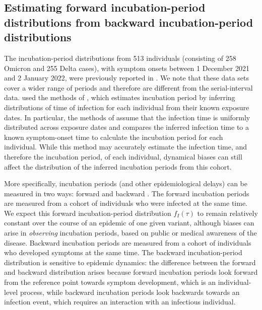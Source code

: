 \documentclass[12pt]{article}
\begin{document}
\subsection{Estimating forward incubation-period distributions from backward incubation-period distributions}

The incubation-period distributions from 513 individuals (consisting of 258 Omicron and 255 Delta cases), with symptom onsets between 1 December 2021 and 2 January 2022, were previously reported in \cite{backer2021omicron}.
We note that these data sets cover a wider range of periods and therefore are different from the serial-interval data.
\cite{backer2021omicron} used the methods of \cite{backer2020incubation}, which estimates incubation period by inferring distributions of time of infection for each individual from their known exposure dates.
In particular, the methods of \cite{backer2020incubation} assume that the infection time is uniformly distributed across exposure dates and compares the inferred infection time to a known symptom-onset time to calculate the incubation period for each individual.
While this method may accurately estimate the infection time, and therefore the incubation period, of each individual, dynamical biases can still affect the distribution of the inferred incubation periods from this cohort.

More specifically, incubation periods (and other epidemiological delays) can be measured in two ways: forward and backward \citep{park2021forward}.
The forward incubation periods are measured from a cohort of individuals who were infected at the same time. 
We expect this forward incubation-period distribution $f_I(\tau)$ to remain relatively constant over the course of an epidemic of one given variant, although biases can arise in \emph{observing} incubation periods, based on public or medical awareness of the disease. 
Backward incubation periods are measured from a cohort of individuals who developed symptoms at the same time. 
The backward incubation-period distribution is sensitive to epidemic dynamics:
the difference between the forward and backward distribution arises because forward incubation periods look forward from the reference point towards symptom development, which is an individual-level process, while backward incubation periods look backwards towards an infection event, which requires an interaction with an infectious individual.
\end{document}
